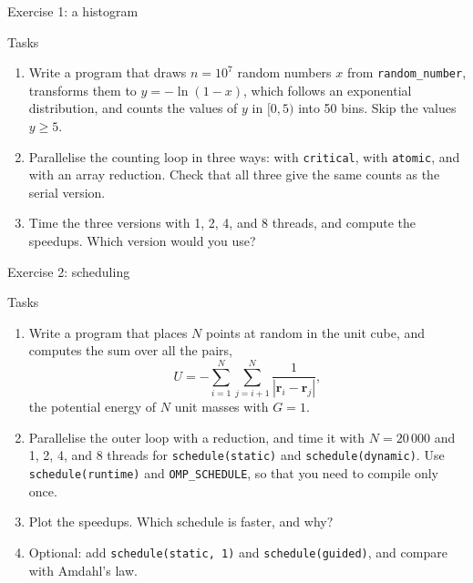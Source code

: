 \begin{frame}{Exercise 1: a histogram}
  \begin{block}{Tasks}
    \begin{enumerate}
      \item Write a program that draws $n = 10^7$ random numbers $x$ from \texttt{random\_number}, transforms them to $y = -\ln(1 - x)$, which follows an exponential distribution, and counts the values of $y$ in $[0, 5)$ into 50 bins. Skip the values $y \geq 5$.
      \item Parallelise the counting loop in three ways: with \texttt{critical}, with \texttt{atomic}, and with an array reduction. Check that all three give the same counts as the serial version.
      \item Time the three versions with 1, 2, 4, and 8 threads, and compute the speedups. Which version would you use?
    \end{enumerate}
  \end{block}
\end{frame}


\begin{frame}{Exercise 2: scheduling}
  \begin{block}{Tasks}
    \begin{enumerate}
      \item Write a program that places $N$ points at random in the unit cube, and computes the sum over all the pairs,
        \[ U = -\sum_{i=1}^{N} \sum_{j=i+1}^{N} \frac{1}{|\mathbf{r}_i - \mathbf{r}_j|}, \]
        the potential energy of $N$ unit masses with $G = 1$.
      \item Parallelise the outer loop with a reduction, and time it with $N = 20\,000$ and 1, 2, 4, and 8 threads for \texttt{schedule(static)} and \texttt{schedule(dynamic)}. Use \texttt{schedule(runtime)} and \texttt{OMP\_SCHEDULE}, so that you need to compile only once.
      \item Plot the speedups. Which schedule is faster, and why?
      \item Optional: add \texttt{schedule(static, 1)} and \texttt{schedule(guided)}, and compare with Amdahl's law.
    \end{enumerate}
  \end{block}
\end{frame}


